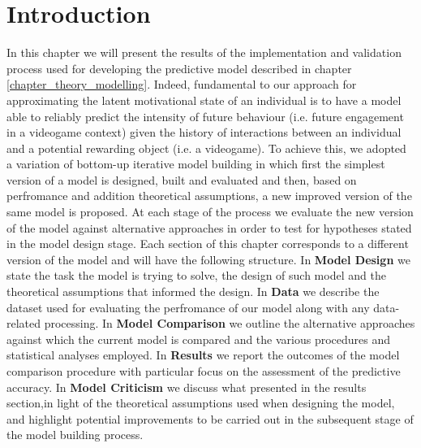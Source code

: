 \section{Introduction}
\label{implementation_testing_introduction}

In this chapter we will present the results of the implementation and validation process used for developing the predictive model described in chapter \ref{chapter_theory_modelling}. Indeed, fundamental to our approach for approximating the latent motivational state of an individual is to have a model able to reliably predict the intensity of future behaviour (i.e. future engagement in a videogame context) given the history of interactions between an individual and a potential rewarding object (i.e. a videogame). To achieve this, we adopted a variation of bottom-up iterative model building \cite{gelman2020bayesian} in which first the simplest version of a model is designed, built and evaluated and then, based on perfromance and addition theoretical assumptions, a new improved version of the same model is proposed. At each stage of the process we evaluate the new version of the model against alternative approaches in order to test for hypotheses stated in the model design stage. Each section of this chapter corresponds to a different version of the model and will have the following structure. In \textbf{Model Design} we state the task the model is trying to solve, the design of such model and the theoretical assumptions that informed the design. In \textbf{Data} we describe the dataset used for evaluating the perfromance of our model along with any data-related processing. In \textbf{Model Comparison} we outline the alternative approaches against which the current model is compared and the various procedures and statistical analyses employed. In \textbf{Results} we report the outcomes of the model comparison procedure with particular focus on the assessment of the predictive accuracy. In \textbf{Model Criticism} we discuss what presented in the results section,in light of the theoretical assumptions used when designing the model, and highlight potential improvements to be carried out in the subsequent stage of the model building process.

